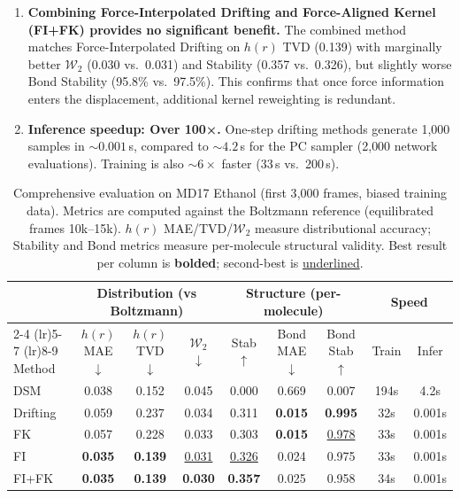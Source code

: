 \documentclass[11pt]{article}
\begin{document}
\begin{enumerate}
    \item \textbf{Combining Force-Interpolated Drifting and Force-Aligned Kernel (FI+FK) provides no significant benefit.}
    The combined method matches Force-Interpolated Drifting on $h(r)$ TVD (0.139) with marginally better $\mathcal{W}_2$ (0.030 vs.\ 0.031) and Stability (0.357 vs.\ 0.326), but slightly worse Bond Stability (95.8\% vs.\ 97.5\%).
    This confirms that once force information enters the displacement, additional kernel reweighting is redundant.

    \item \textbf{Inference speedup: Over 100×.}
    One-step drifting methods generate 1{,}000 samples in ${\sim}0.001$\,s, compared to ${\sim}4.2$\,s for the PC sampler (2{,}000 network evaluations).
    Training is also ${\sim}6\times$ faster (33\,s vs.\ 200\,s).
\end{enumerate}

\begin{table}[t]
\centering
\caption{Comprehensive evaluation on MD17 Ethanol (first 3{,}000 frames, biased training data). Metrics are computed against the Boltzmann reference (equilibrated frames 10k--15k). $h(r)$ MAE/TVD/$\mathcal{W}_2$ measure distributional accuracy; Stability and Bond metrics measure per-molecule structural validity. Best result per column is \textbf{bolded}; second-best is \underline{underlined}.}
\label{tab:md17-results}
\footnotesize
\setlength{\tabcolsep}{4pt}  %
\begin{tabular}{@{}lcccccccc@{}}
\toprule
& \multicolumn{3}{c}{Distribution (vs Boltzmann)} & \multicolumn{3}{c}{Structure (per-molecule)} & \multicolumn{2}{c}{Speed} \\
\cmidrule(lr){2-4} \cmidrule(lr){5-7} \cmidrule(lr){8-9}
Method & $h(r)$ MAE $\downarrow$ & $h(r)$ TVD $\downarrow$ & $\mathcal{W}_2$ $\downarrow$ & Stab $\uparrow$ & Bond MAE $\downarrow$ & Bond Stab $\uparrow$ & Train & Infer \\
\midrule
DSM & 0.038 & 0.152 & 0.045 & 0.000 & 0.669 & 0.007 & 194s & 4.2s \\
\midrule
Drifting & 0.059 & 0.237 & 0.034 & 0.311 & \textbf{0.015} & \textbf{0.995} & 32s & 0.001s \\
FK & 0.057 & 0.228 & 0.033 & 0.303 & \textbf{0.015} & \underline{0.978} & 33s & 0.001s \\
FI & \textbf{0.035} & \textbf{0.139} & \underline{0.031} & \underline{0.326} & 0.024 & 0.975 & 33s & 0.001s \\
FI+FK & \textbf{0.035} & \textbf{0.139} & \textbf{0.030} & \textbf{0.357} & 0.025 & 0.958 & 34s & 0.001s \\
\bottomrule
\end{tabular}
\end{table}
\end{document}
